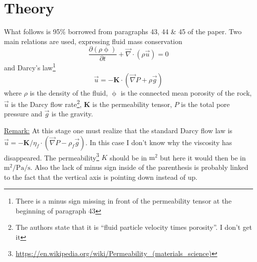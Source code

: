 \section*{Theory}

What follows is 95\% borrowed from paragraphs 43, 44 \& 45 of the paper.
Two main relations are used, expressing fluid mass conservation
\begin{equation}
\frac{\partial (\rho \upphi)}{\partial t} + \vec\nabla\cdot (\rho \vec{u}) = 0
\label{eq:por01}
\end{equation}
and Darcy's law\footnote{There is a minus sign missing in front of the permeability tensor at the 
beginning of paragraph 43}
\begin{equation}
\vec{u} = - {\bm K} \cdot (\vec{\nabla} P + \rho \vec{g})
\label{eq:por00}
\end{equation}
where $\rho$ is the density of the fluid, $\upphi$ is the
connected mean porosity of the rock, $\vec{u}$ is the Darcy flow
rate\footnote{The authors state that it is ``fluid particle velocity times porosity''. 
I don't get it}, ${\bm K}$ is the permeability tensor, $P$ is the total pore pressure and $\vec{g}$ is
the gravity. 

\underline{Remark:} 
At this stage one must realize that the standard Darcy flow law is 
$\vec{u} = - {\bm K}/\eta_f \cdot (\vec{\nabla} P - \rho_f \vec{g})$. 
In this case I don't know why the viscosity has disappeared. 
The permeability\footnote{\url{https://en.wikipedia.org/wiki/Permeability_(materials_science)}} 
$K$ should be in $\si{\square\meter}$ but here it would then be in $\si{\square\meter\per\pascal\per\second}$. 
Also the lack of minus sign inside of the parenthesis 
is probably linked to the fact that the vertical axis is pointing down instead of up. 

